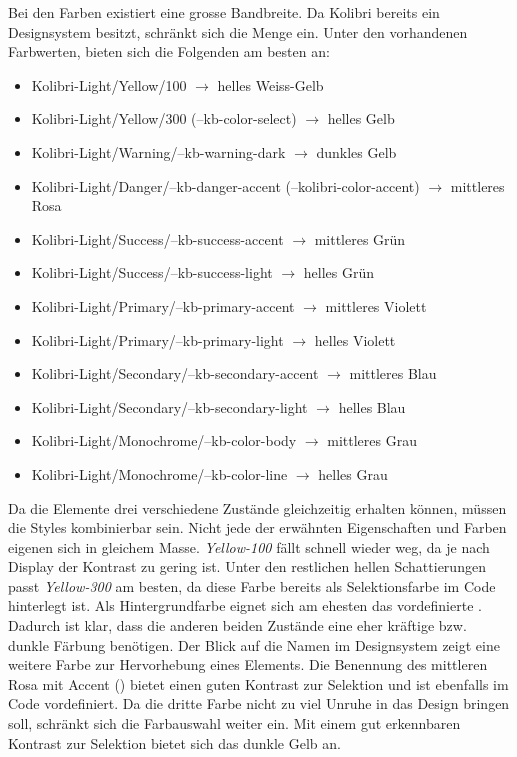 Bei den Farben existiert eine grosse Bandbreite.
Da Kolibri bereits ein Designsystem besitzt, schränkt sich die Menge ein.
Unter den vorhandenen Farbwerten, bieten sich die Folgenden am besten an:

\begin{itemize}
    \item Kolibri-Light/Yellow/100 $\rightarrow$ helles Weiss-Gelb
    \item Kolibri-Light/Yellow/300 (--kb-color-select) $\rightarrow$ helles Gelb
    \item Kolibri-Light/Warning/--kb-warning-dark $\rightarrow$ dunkles Gelb
    \item Kolibri-Light/Danger/--kb-danger-accent (--kolibri-color-accent) $\rightarrow$ mittleres Rosa
    \item Kolibri-Light/Success/--kb-success-accent $\rightarrow$ mittleres Grün
    \item Kolibri-Light/Success/--kb-success-light $\rightarrow$ helles Grün
    \item Kolibri-Light/Primary/--kb-primary-accent $\rightarrow$ mittleres Violett
    \item Kolibri-Light/Primary/--kb-primary-light $\rightarrow$ helles Violett
    \item Kolibri-Light/Secondary/--kb-secondary-accent $\rightarrow$ mittleres Blau
    \item Kolibri-Light/Secondary/--kb-secondary-light $\rightarrow$ helles Blau
    \item Kolibri-Light/Monochrome/--kb-color-body $\rightarrow$ mittleres Grau
    \item Kolibri-Light/Monochrome/--kb-color-line $\rightarrow$ helles Grau
\end{itemize}

Da die Elemente drei verschiedene Zustände gleichzeitig erhalten können, müssen die Styles kombinierbar sein.
Nicht jede der erwähnten Eigenschaften und Farben eigenen sich in gleichem Masse.
\emph{Yellow-100} fällt schnell wieder weg, da je nach Display der Kontrast zu gering ist.
Unter den restlichen hellen Schattierungen passt \emph{Yellow-300} am besten, da diese Farbe bereits als Selektionsfarbe im Code hinterlegt ist.
Als Hintergrundfarbe eignet sich am ehesten das vordefinierte . 
Dadurch ist klar, dass die anderen beiden Zustände eine eher kräftige bzw. dunkle Färbung benötigen.
Der Blick auf die Namen im Designsystem zeigt eine weitere Farbe zur Hervorhebung eines Elements.
Die Benennung des mittleren Rosa mit Accent () bietet einen guten Kontrast zur Selektion und ist ebenfalls im Code vordefiniert.
Da die dritte Farbe nicht zu viel Unruhe in das Design bringen soll, schränkt sich die Farbauswahl weiter ein.
Mit einem gut erkennbaren Kontrast zur Selektion bietet sich das dunkle Gelb  an.

